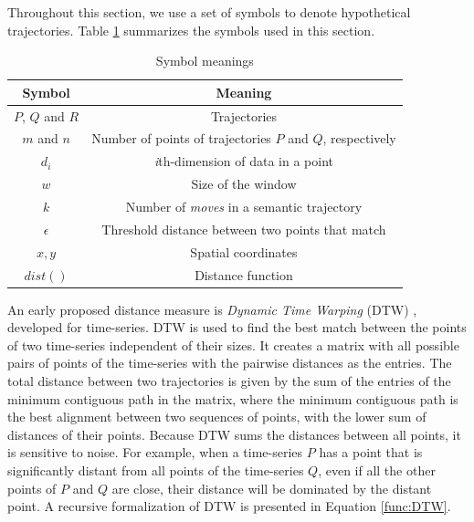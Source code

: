 \documentclass[12pt]{article}
\begin{document}
Throughout this section, we use a set of symbols to denote hypothetical trajectories. Table \ref{tab:symbols} summarizes the symbols used in this section.

\begin{table}[!h]
    \centering
    \begin{tabular}{c|c}
         Symbol & Meaning  \\
         \hline
         $P$, $Q$ and $R$ & Trajectories \\
         $m$ and $n$ & Number of points of trajectories $P$ and $Q$, respectively \\
         $d_i$ & \emph{i}th-dimension of data in a point \\
         $w$ & Size of the window \\
         $k$ & Number of \emph{moves} in a semantic trajectory \\
         $\epsilon$ & Threshold distance between two points that match \\
         $x,y$ & Spatial coordinates \\
         $dist()$ & Distance function
    \end{tabular}
    \caption{Symbol meanings}
    \label{tab:symbols}
\end{table}

An early proposed distance measure is \emph{Dynamic Time Warping} (DTW) \cite{berndt1994using}, developed for time-series. DTW is used to find the best match between the points of two time-series independent of their sizes. It creates a matrix with all possible pairs of points of the time-series with the pairwise distances as the entries. %
The total distance between two trajectories is given by the sum of the entries of the minimum contiguous path in the matrix{, where the minimum contiguous path is the best alignment between two sequences of points, with the lower sum of distances of their points}. Because DTW sums the distances between all points, it is sensitive to noise. For example, when a time-series $P$ has a point that is significantly distant from all points of the time-series $Q$, even if all the other points of $P$ and $Q$ are close, their distance will be dominated by the distant point. A recursive formalization of DTW is presented in Equation \ref{func:DTW}.

\end{document}

